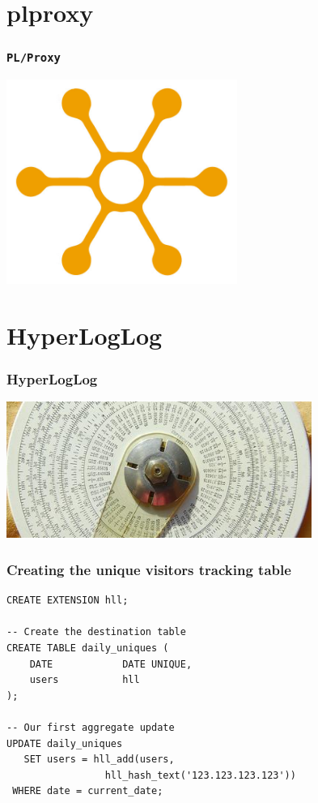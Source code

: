 \documentclass{beamer}
\begin{document}
\section{plproxy}

\begin{frame}[fragile]
  \frametitle{\texttt{PL/Proxy}}

\begin{center}
  \includegraphics[height=18em]{distribution.jpg}
\end{center}
\end{frame}

\section{HyperLogLog}

\begin{frame}[fragile]
  \frametitle{HyperLogLog}

  \vfill

\begin{center}
  \includegraphics[height=12em]{cardinality1.jpg}
\end{center}
\end{frame}

\begin{frame}[fragile]
  \frametitle{Creating the unique visitors tracking table}

\begin{verbatim}
CREATE EXTENSION hll;

-- Create the destination table
CREATE TABLE daily_uniques (
    DATE            DATE UNIQUE,
    users           hll
);

-- Our first aggregate update
UPDATE daily_uniques
   SET users = hll_add(users,
                 hll_hash_text('123.123.123.123'))
 WHERE date = current_date;
\end{verbatim}  
\end{frame}
\end{document}
